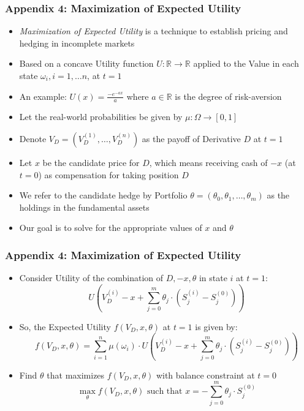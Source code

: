 \documentclass{beamer}
\begin{document}
\begin{frame}
\frametitle{Appendix 4: Maximization of Expected Utility}
\begin{itemize}
\item {\em Maximization of Expected Utility} is a technique to establish pricing and hedging in incomplete markets
\item Based on a concave Utility function $U : \mathbb{R} \rightarrow \mathbb{R}$ applied to the Value in each state $\omega_i, i = 1, \ldots n$, at $t=1$
\item An example: $U(x) = \frac {-e^{-ax}} {a}$ where $a \in \mathbb{R}$ is the degree of risk-aversion
\item Let the real-world probabilities be given by $\mu: \Omega \rightarrow [0,1]$
\item Denote $V_D = (V_D^{(1)}, \ldots, V_D^{(n)})$ as the payoff of Derivative $D$ at $t=1$
\item Let $x$ be the candidate price for $D$, which means receiving cash of $-x$ (at $t=0$) as compensation for taking position $D$
\item We refer to the candidate hedge by Portfolio $\theta = (\theta_0, \theta_1, \ldots, \theta_m)$ as the holdings in the fundamental assets
\item Our goal is to solve for the appropriate values of $x$ and $\theta$
\end{itemize}
\end{frame}

\begin{frame}
\frametitle{Appendix 4: Maximization of Expected Utility}
\begin{itemize}
\item Consider Utility of the combination of $D, -x, \theta$ in state $i$ at $t=1$:
$$U(V_D^{(i)} -x + \sum_{j=0}^m \theta_j \cdot (S_j^{(i)} - S_j^{(0)}))$$
\item So, the Expected Utility $f(V_D,x, \theta)$ at $t=1$ is given by:
$$f(V_D, x, \theta) = \sum_{i=1}^n \mu(\omega_i) \cdot U(V_D^{(i)} -x + \sum_{j=0}^m \theta_j \cdot (S_j^{(i)} - S_j^{(0)})) $$
\item Find $\theta$ that maximizes $f(V_D,x,\theta)$ with balance constraint at $t=0$
$$\max_{\theta} f(V_D, x, \theta) \mbox{ such that } x = - \sum_{j=0}^m \theta_j \cdot S_j^{(0)}$$
\end{itemize}
\end{frame}
\end{document}
